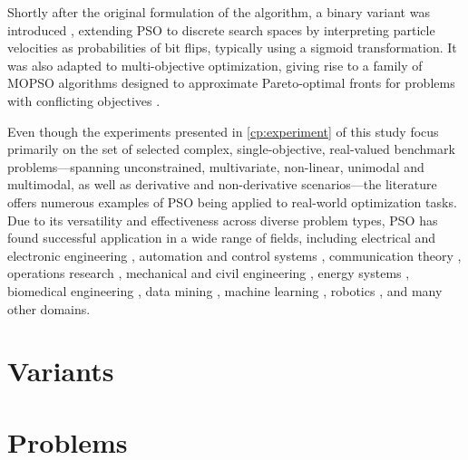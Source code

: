 {Shortly after the original formulation of the algorithm, a binary variant was introduced \citep{kennedy1997discrete}, extending PSO to discrete search spaces by interpreting particle velocities as probabilities of bit flips, typically using a sigmoid transformation. 
It was also adapted to multi-objective optimization, giving rise to a family of MOPSO algorithms designed to approximate Pareto-optimal fronts for problems with conflicting objectives \citep{alvarezbenitez2005mopso, nebro2009smpsomcdm, shao2025improved}.


Even though the experiments presented in \autoref{cp:experiment} of this study focus primarily on the set of selected complex, single-objective, real-valued benchmark problems—spanning unconstrained, multivariate, non-linear, unimodal and multimodal, as well as derivative and non-derivative scenarios---the literature offers numerous examples of PSO being applied to real-world optimization tasks. Due to its versatility and effectiveness across diverse problem types, PSO has found successful application in a wide range of fields, including
electrical and electronic engineering \citep[e.g.,][]{jin2024improved, salvatierra2024pso, dibya2025optimized},
automation and control systems \citep[e.g.,][]{duan2024using,urgan2024pso,gil2024platooning}, 
communication theory \citep[e.g.,][]{qiao2025resource,jin2024overview,jin2025design}, 
operations research \citep[e.g.,][]{li2025ore,omran2025empirical,dong2022optimized, palaniappan2025task, simaiya2024hybrid}, 
mechanical and civil engineering \citep[e.g.,][]{ramkumar2025intelligent,wang2025optimisation,houssein2025recent}, 
energy systems \citep[e.g.,][]{bade2025multi,zhang2024energy,hamza2024optimization}, 
biomedical engineering \citep[e.g.,][]{mallik2024swarm}, 
data mining \citep[e.g.,][]{shan2024research,zuo2024knowledge,carstensen2025efficient}, 
machine learning \citep[e.g.,][]{alenezi2025hybrid,balavani2024enhanced,tijjani2024enhanced}, 
robotics \citep[e.g.,][]{sharma2025swarm,liu2025design,prakash2024swarm}, 
and many other domains. 





\section{Variants}





\section{Problems}


}
